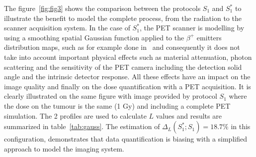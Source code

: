 \documentclass[11pt]{iopart}
\begin{document}
The figure~\ref{fig:fig3} shows the comparison between the protocols $S_{1}$ and $S_{1}^{*}$ to illustrate the benefit to model the complete process, from the radiation to the scanner acquisition system. In the case of $S_{1}^{*}$, the PET scanner is modelling by using a smoothing spatial Gaussian function applied to the $\beta^{+}$ emitters distribution maps, such as for example done in~\cite{Parodi2007a} and consequently it does not take into account important physical effects such as material attenuation, photon scattering and the sensitivity of the PET camera including the detection solid angle and the intrinsic detector response. All these effects have an impact on the image quality and finally on the dose quantification with a PET acquisition. It is clearly illustrated on the same figure with image provided by protocol $S_{1}$ where the dose on the tumour is the same (1 Gy) and including a complete PET simulation. The 2 profiles are used to calculate $L$ values and results are summarized in table~\ref{tab:gauss}. The estimation of $\Delta_{L}(S_{1}^{*};S_{1}) = 18.7 \%$ in this configuration, demonstrates that data quantification is biasing  
with a simplified approach to model the imaging system.
\end{document}
